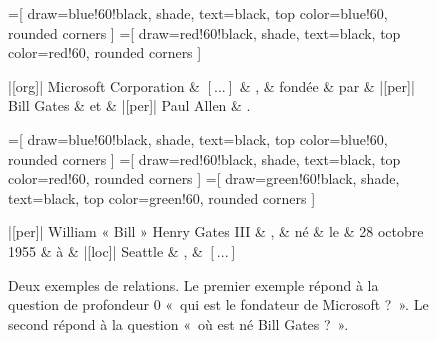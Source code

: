 \documentclass[12pt,a4paper,times,twoside,openright]{report}
\begin{document}
\begin{figure}[ht!]
\centering
    \begin{dependency}[theme=default]
        =[
            draw=blue!60!black, shade, text=black,
            top color=blue!60, rounded corners
        ]
        =[
            draw=red!60!black, shade, text=black,
            top color=red!60, rounded corners
        ]
        \begin{deptext}[column sep=1.0em]
             |[org]| Microsoft Corporation \& $[...]$ \& , \& fondée \& par \& |[per]| Bill Gates \& et \& |[per]| Paul Allen \& . \\
        \end{deptext}
    \end{dependency}
    
    \begin{dependency}[theme=default]
        =[
            draw=blue!60!black, shade, text=black,
            top color=blue!60, rounded corners
        ]
        =[
            draw=red!60!black, shade, text=black,
            top color=red!60, rounded corners
        ]
        =[
            draw=green!60!black, shade, text=black,
            top color=green!60, rounded corners
        ]
        \begin{deptext}[column sep=0.75em]  
             |[per]| William « Bill » Henry Gates III \& , \& né \& le \& 28 octobre 1955 \& à \& |[loc]| Seattle \& , \& $[...]$ \\
        \end{deptext}
    \end{dependency}
\caption{Deux exemples de relations. Le premier exemple répond à la question de profondeur 0 «\ qui est le fondateur de Microsoft ?\ ». Le second répond à la question «\ où est né Bill Gates ?\ ».}
\label{fig:relation-extraction-example}
\end{figure}


        
\end{document}
